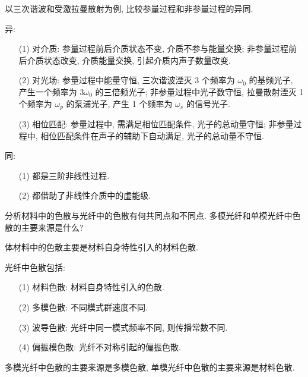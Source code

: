 \documentclass{assignment}
\begin{document}
\begin{prob}
    以三次谐波和受激拉曼散射为例, 比较参量过程和非参量过程的异同.
\end{prob}
\begin{sol}
    异:
    \begin{itemize}
        \item[(1)] 对介质: 参量过程前后介质状态不变, 介质不参与能量交换; 非参量过程前后介质状态改变, 介质能量交换, 引起介质内声子数量改变.
        \item[(2)] 对光场: 参量过程中能量守恒, 三次谐波湮灭 3 个频率为 $\omega_0$ 的基频光子, 产生一个频率为 $3\omega_0$ 的三倍频光子; 非参量过程中光子数守恒, 拉曼散射湮灭 1 个频率为 $\omega_p$ 的泵浦光子, 产生 1 个频率为 $\omega_s$ 的信号光子.
        \item[(3)] 相位匹配: 参量过程中, 需满足相位匹配条件, 光子的总动量守恒; 非参量过程中, 相位匹配条件在声子的辅助下自动满足, 光子的总动量不守恒.
    \end{itemize}

    同:
    \begin{itemize}
        \item[(1)] 都是三阶非线性过程.
        \item[(2)] 都借助了非线性介质中的虚能级.
    \end{itemize}
\end{sol}

\begin{prob}
    分析材料中的色散与光纤中的色散有何共同点和不同点. 多模光纤和单模光纤中色散的主要来源是什么?
\end{prob}
\begin{sol}
    体材料中的色散主要是材料自身特性引入的材料色散.

    光纤中色散包括:
    \begin{itemize}
        \item[(1)] 材料色散: 材料自身特性引入的色散.
        \item[(2)] 多模色散: 不同模式群速度不同.
        \item[(3)] 波导色散: 光纤中同一模式频率不同, 则传播常数不同.
        \item[(4)] 偏振模色散: 光纤不对称引起的偏振色散.
    \end{itemize}

    多模光纤中色散的主要来源是多模色散, 单模光纤中色散的主要来源是材料色散.
\end{sol}
\end{document}
